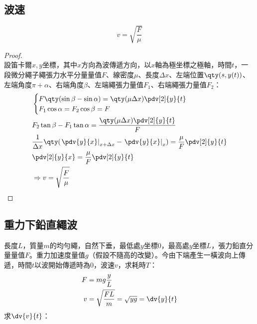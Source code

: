 \documentclass[a4paper,12pt]{report}
\begin{document}
\subsection{波速}
\[v=\sqrt{\frac{F}{\mu}}\]
\begin{proof}\mbox{}\\
設笛卡爾$x,y$坐標，其中$x$方向為波傳遞方向，以$x$軸為極坐標之極軸，時間$t$，一段微分繩子繩張力水平分量量值$F$、線密度$\mu$、長度$\Delta x$、左端位置$\qty(s,y(t))$、左端角度$\pi+\alpha$、右端角度$\beta$、左端繩張力量值$F_1$、右端繩張力量值$F_2$：
\[\begin{aligned}
&\begin{cases}
F\qty(\sin\beta-\sin\alpha)=\qty(\mu\Delta x)\pdv[2]{y}{t}\\
F_1\cos\alpha=F_2\cos\beta=F
\end{cases}\\
& F_2\tan\beta-F_1\tan\alpha=\frac{\qty(\mu\Delta x)\pdv[2]{y}{t}}{F}\\
& \frac{1}{\Delta x}\qty(\left.\pdv{y}{x}\right|_{x+\Delta x}-\left.\pdv{y}{x}\right|_x)=\frac{\mu}{F}\pdv[2]{y}{t}\\
& \pdv[2]{y}{x}=\frac{\mu}{F}\pdv[2]{y}{t}\\
& \Rightarrow v=\sqrt{\frac{F}{\mu}}
\end{aligned}\]
\end{proof}
\subsection{重力下鉛直繩波}
長度$L$，質量$m$的均勻繩，自然下垂，最低處$y$坐標$0$，最高處$y$坐標$L$，張力鉛直分量量值$F$。重力加速度量值$g$（假設不隨高的改變）。今由下端產生一橫波向上傳遞，時間$t$以波開始傳遞時為0，波速$v$，求耗時$T$：
\[\begin{aligned}
F &= mg\frac{y}{L}\\
v &= \sqrt{\frac{FL}{m}}=\sqrt{yg}=\dv{y}{t}
\end{aligned}\]
求$\dv{v}{t}$：
\end{document}
